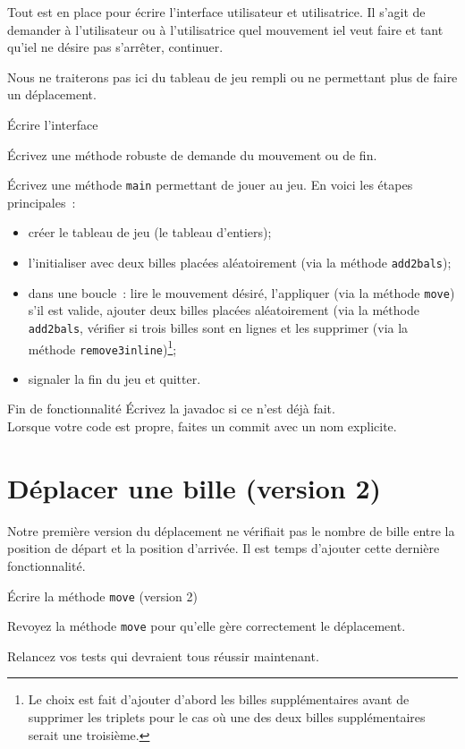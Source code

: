 \documentclass[a4paper,11pt]{style-esi/td}
\newcommand{\findefonctionnalite}{
\begin{infoit}{Fin de fonctionnalité}
	Écrivez la javadoc si ce n'est déjà fait.\\  
	Lorsque votre code est propre, faites un commit avec un nom explicite. 
\end{infoit}
}
\begin{document}
Tout est en place pour écrire l'interface utilisateur et utilisatrice. Il
s'agit de demander à l'utilisateur ou à l'utilisatrice quel mouvement iel veut
faire et tant qu'iel ne désire pas s'arrêter, continuer. 

Nous ne traiterons pas ici du tableau de jeu rempli ou ne permettant plus de
faire un déplacement. 

\begin{Exercice}{Écrire l'interface}
	\begin{steps}
	\item Écrivez une méthode robuste de demande du mouvement ou de fin.
	\item Écrivez une méthode \texttt{main} permettant de jouer au jeu. En voici 
		les étapes principales~:
		\begin{itemize}
			\item créer le tableau de jeu (le tableau d'entiers);
			\item l'initialiser avec deux billes placées aléatoirement (via la 
				méthode \texttt{add2bals});
			\item dans une boucle~: lire le mouvement désiré, 
				l'appliquer (via la méthode \texttt{move}) s'il est valide, 
				ajouter deux billes placées aléatoirement
				(via la méthode \texttt{add2bals},
				vérifier si trois billes sont en lignes et les supprimer 
				(via la méthode \texttt{remove3inline})\footnote{Le choix est 
				fait d'ajouter d'abord les billes supplémentaires avant de 
				supprimer les triplets pour le cas où une des deux billes 
				supplémentaires serait une troisième.}; 
			\item signaler la fin du jeu et quitter. 
		\end{itemize}
	\end{steps}
\end{Exercice}

\findefonctionnalite 

\section{Déplacer une bille (version 2)}

Notre première version du déplacement ne vérifiait pas le nombre de bille entre
la position de départ et la position d'arrivée. Il est temps d'ajouter cette
dernière fonctionnalité. 

\begin{Exercice}{Écrire la méthode \texttt{move} (version 2)}
	\begin{steps}
	\item Revoyez la méthode \texttt{move} pour qu'elle gère correctement le 
		déplacement. 
	\item Relancez vos tests qui devraient tous réussir maintenant. 
	\end{steps}
\end{Exercice}
\end{document}
